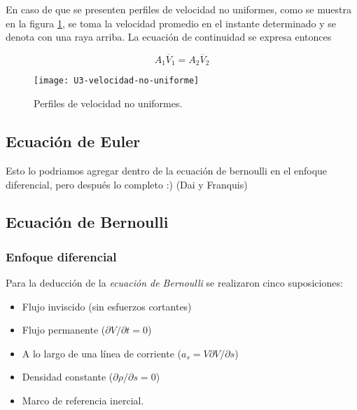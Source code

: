 En caso de que se presenten perfiles de velocidad no uniformes, como se muestra en la figura \ref{fig:velocidad-no-uniforme}, se toma la velocidad promedio en el instante determinado y se denota con una raya arriba. La ecuación de continuidad se expresa entonces

\begin{equation}
	A_1 \overline{V}_1= A_2  \overline{V}_2
	\label{eq:continuidad-2}
\end{equation} 

\begin{figure}[H]
	\centering
	\texttt{[image: U3-velocidad-no-uniforme]}
	\caption{Perfiles de velocidad no uniformes.}
	\label{fig:velocidad-no-uniforme}
\end{figure}

\subsection{Ecuación de Euler}

Esto lo podriamos agregar dentro de la ecuación de bernoulli en el enfoque diferencial, pero después lo completo :) (Dai y Franquis)

\subsection{Ecuación de Bernoulli}

\subsubsection{Enfoque diferencial}

Para la deducción de la \emph{ecuación de Bernoulli} se realizaron cinco suposiciones:
\begin{itemize}
	\item Flujo inviscido (sin esfuerzos cortantes)\vspace{-.2cm}
	\item Flujo permanente ($\partial V / \partial t = 0$)\vspace{-.2cm}
	\item A lo largo de una línea de corriente ($a_s = V \partial V / \partial s$)\vspace{-.2cm}
	\item Densidad constante ($\partial \rho / \partial s = 0$)\vspace{-.2cm}
	\item Marco de referencia inercial.
\end{itemize}

